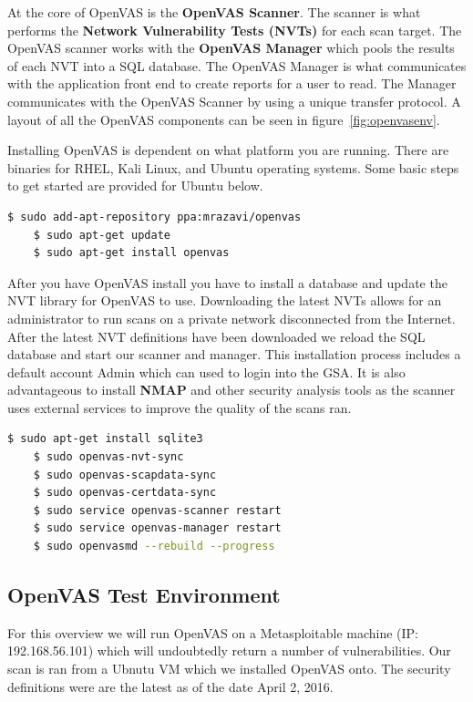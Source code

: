 \documentclass[12pt]{article}
\begin{document}
At the core of OpenVAS is the \textbf{OpenVAS Scanner}. The scanner is what 
performs the \textbf{Network Vulnerability Tests (NVTs)} for each scan target. 
The OpenVAS scanner works with the \textbf{OpenVAS Manager} which pools the 
results of each NVT into a SQL database. The OpenVAS Manager is what 
communicates with the application front end to create reports for a user 
to read. The Manager communicates with the OpenVAS Scanner by using a unique 
transfer protocol. A layout of all the OpenVAS components can be seen in 
figure~\ref{fig:openvasenv}.

Installing OpenVAS is dependent on what platform you are running. There are 
binaries for RHEL, Kali Linux, and Ubuntu operating systems. Some basic
steps to get started are provided for Ubuntu below.

\begin{lstlisting}[language=bash]
    $ sudo add-apt-repository ppa:mrazavi/openvas
    $ sudo apt-get update
    $ sudo apt-get install openvas
\end{lstlisting}

After you have OpenVAS install you have to install a database and update
the NVT library for OpenVAS to use. Downloading the latest NVTs allows for
an administrator to run scans on a private network disconnected from the 
Internet. After the latest NVT definitions have been downloaded we reload
the SQL database and start our scanner and manager. This installation process
includes a default account Admin which can used to login into the GSA. It
is also advantageous to install \textbf{NMAP} and other security analysis
tools as the scanner uses external services to improve the quality of the
scans ran. 

\begin{lstlisting}[language=bash]
    $ sudo apt-get install sqlite3
    $ sudo openvas-nvt-sync
    $ sudo openvas-scapdata-sync
    $ sudo openvas-certdata-sync
    $ sudo service openvas-scanner restart
    $ sudo service openvas-manager restart
    $ sudo openvasmd --rebuild --progress
\end{lstlisting}

\subsection{OpenVAS Test Environment}
\label{sec:testenv}
For this overview we will run OpenVAS on a Metasploitable machine 
(IP: 192.168.56.101) which will undoubtedly return a number of 
vulnerabilities. Our scan is ran from a Ubnutu VM which we installed OpenVAS 
onto. The security definitions were are the latest as of the date April 2, 
2016. 
\end{document}
